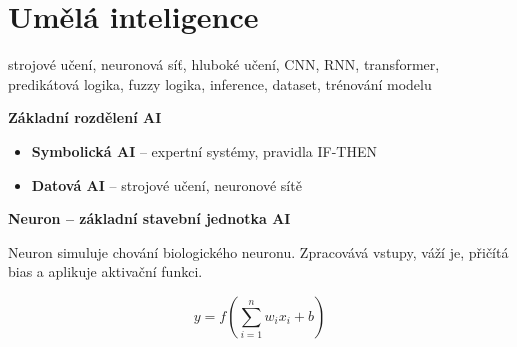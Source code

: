 \documentclass[a4paper,10pt]{article}
\begin{document}
\newpage


\section{Umělá inteligence}

\begin{pojmybox}
strojové učení, neuronová síť, hluboké učení, CNN, RNN, transformer,
predikátová logika, fuzzy logika, inference, dataset, trénování modelu
\end{pojmybox}

\begin{vysvetlenibox}

\textbf{Základní rozdělení AI}

\begin{itemize}
\item \textbf{Symbolická AI} – expertní systémy, pravidla IF-THEN
\item \textbf{Datová AI} – strojové učení, neuronové sítě
\end{itemize}

\textbf{Neuron – základní stavební jednotka AI}

Neuron simuluje chování biologického neuronu. Zpracovává vstupy,
váží je, přičítá bias a aplikuje aktivační funkci.

\begin{center}
\end{center}

\begin{vzorcebox}
\[
y = f\left(\sum_{i=1}^{n} w_i x_i + b\right)
\]
\end{vzorcebox}


\end{vysvetlenibox}
\end{document}
